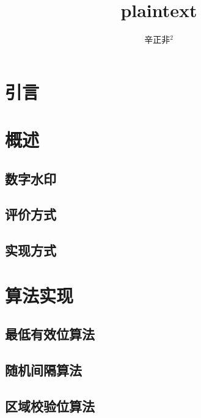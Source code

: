 \documentclass[a4paper,zihao=5,UTF8]{ctexart}
\title{\Large\CJKfamily{zhkai} plaintext}
\author{
        \zihao{-4}
        辛正非$^2$\quad 
    }
\affil{（
    \zihao{-5}
    {上海第二工业大学\quad{}上海\quad{}201209} 
）}
\date{}
\begin{document}
	\maketitle
	{
	}
    
    \noindent{}

    \noindent{}
    \songti{
        
    }

\section{引言}

\section{概述}

\subsection{数字水印}

\subsection{评价方式}

\subsection{实现方式}

\section{算法实现}

\subsection{最低有效位算法}

\subsection{随机间隔算法}

\subsection{区域校验位算法}
\end{document}
